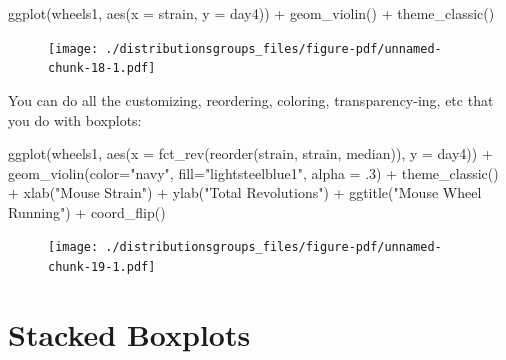\documentclass[
  letterpaper,
  DIV=11,
  numbers=noendperiod]{scrreprt}
\newenvironment{Shaded}{\begin{snugshade}}{\end{snugshade}}
\newcommand{\AttributeTok}[1]{\textcolor[rgb]{0.40,0.45,0.13}{#1}}
\newcommand{\DecValTok}[1]{\textcolor[rgb]{0.68,0.00,0.00}{#1}}
\newcommand{\FunctionTok}[1]{\textcolor[rgb]{0.28,0.35,0.67}{#1}}
\newcommand{\NormalTok}[1]{\textcolor[rgb]{0.00,0.23,0.31}{#1}}
\newcommand{\SpecialCharTok}[1]{\textcolor[rgb]{0.37,0.37,0.37}{#1}}
\newcommand{\StringTok}[1]{\textcolor[rgb]{0.13,0.47,0.30}{#1}}
\begin{document}
\begin{Shaded}
\begin{Highlighting}[]
\FunctionTok{ggplot}\NormalTok{(wheels1, }\FunctionTok{aes}\NormalTok{(}\AttributeTok{x =}\NormalTok{ strain, }\AttributeTok{y =}\NormalTok{ day4)) }\SpecialCharTok{+}  
  \FunctionTok{geom\_violin}\NormalTok{() }\SpecialCharTok{+} 
  \FunctionTok{theme\_classic}\NormalTok{()}
\end{Highlighting}
\end{Shaded}

\begin{figure}[H]

{\centering \texttt{[image: ./distributionsgroups\_files/figure-pdf/unnamed-chunk-18-1.pdf]}

}

\end{figure}

You can do all the customizing, reordering, coloring, transparency-ing,
etc that you do with boxplots:

\begin{Shaded}
\begin{Highlighting}[]
\FunctionTok{ggplot}\NormalTok{(wheels1, }\FunctionTok{aes}\NormalTok{(}\AttributeTok{x =} \FunctionTok{fct\_rev}\NormalTok{(}\FunctionTok{reorder}\NormalTok{(strain, strain, median)), }\AttributeTok{y =}\NormalTok{ day4)) }\SpecialCharTok{+} 
  \FunctionTok{geom\_violin}\NormalTok{(}\AttributeTok{color=}\StringTok{"navy"}\NormalTok{, }\AttributeTok{fill=}\StringTok{"lightsteelblue1"}\NormalTok{, }\AttributeTok{alpha =}\NormalTok{ .}\DecValTok{3}\NormalTok{) }\SpecialCharTok{+}
  \FunctionTok{theme\_classic}\NormalTok{() }\SpecialCharTok{+}
  \FunctionTok{xlab}\NormalTok{(}\StringTok{"Mouse Strain"}\NormalTok{) }\SpecialCharTok{+}
  \FunctionTok{ylab}\NormalTok{(}\StringTok{"Total Revolutions"}\NormalTok{) }\SpecialCharTok{+}
  \FunctionTok{ggtitle}\NormalTok{(}\StringTok{"Mouse Wheel Running"}\NormalTok{) }\SpecialCharTok{+}
  \FunctionTok{coord\_flip}\NormalTok{() }
\end{Highlighting}
\end{Shaded}

\begin{figure}[H]

{\centering \texttt{[image: ./distributionsgroups\_files/figure-pdf/unnamed-chunk-19-1.pdf]}

}

\end{figure}

\hypertarget{stacked-boxplots}{%
\section{Stacked Boxplots}\label{stacked-boxplots}}
\end{document}
